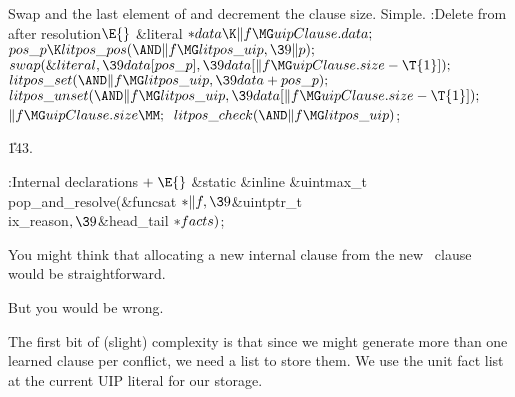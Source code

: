 Swap  and the last element of 
and decrement the clause
size. Simple.
\Y\B\4:Delete  from  after
resolution\X${}\E{}$\6
\&{literal} ${}{*}\\{data}\K\|f\MG\\{uipClause}.\\{data};{}$\7
${}\\{pos\_p}\K\\{litpos\_pos}({\AND}\|f\MG\\{litpos\_uip},\39\|p);{}$\6
${}\\{swap}(\&{literal},\39\\{data}[\\{pos\_p}],\39\\{data}[\|f\MG%
\\{uipClause}.\\{size}-\T{1}]);{}$\6
${}\\{litpos\_set}({\AND}\|f\MG\\{litpos\_uip},\39\\{data}+\\{pos\_p});{}$\6
${}\\{litpos\_unset}({\AND}\|f\MG\\{litpos\_uip},\39\\{data}[\|f\MG%
\\{uipClause}.\\{size}-\T{1}]);{}$\6
${}\|f\MG\\{uipClause}.\\{size}\MM;{}$\6
${}\\{litpos\_check}({\AND}\|f\MG\\{litpos\_uip}){}$;\par
\U143.\fi

\Y\B\4:Internal declarations\X${}\mathrel+\E{}$\6
\&{static} \&{inline} \&{uintmax\_t} \\{pop\_and\_resolve}(\&{funcsat} ${}{*}%
\|f,\39{}$\&{uintptr\_t} \\{ix\_reason}${},\39{}$\&{head\_tail} ${}{*}%
\\{facts}){}$;\par
\fi

You might think that allocating a new internal clause from the new \UIP\
clause would be straightforward.

But you would be wrong.

The first bit of (slight) complexity is that since we might generate more than
one learned clause per conflict, we need a list to store them. We use the unit
fact list at the current UIP literal \PB{\|p} for our storage.

